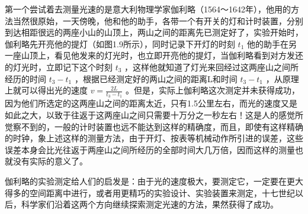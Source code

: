 第一个尝试着去测量光速的是意大利物理学家伽利略（1564～1642年），他用的方法当然很原始，一天傍晚，他和他的助手，各带一个有开关的灯和计时装置，分别到达相距很远的两座小山的山顶上，两山之间的距离先已测定好了，实验开始时，伽利略先开亮他的提灯（如图1.9所示），同时记录下开灯的时刻
\(t_{1}\)
他的助手在另一座山顶上，看见他发来的灯光时，也立即开亮他的提灯，当伽利略看到对方发还的灯光时，立即记下这个时刻
\(t_{3}\) ，这样他就知道了灯光来回经过这两座山之间所经历的时间
\(t_{3}-t_{1}\) ，根据已经测定好的两山之间的距离L和时间 \(t_{3}-t_{1}\)
，从原理上就可以得出光的速度 \(v=\frac{2L}{t_{3}-t_{1}}\)
。但是，实际上伽利略这次测定并未获得成功，因为他们所选定的这两座山之间的距离太近，只有1.5公里左右，而光的速度又是如此之大，以致于往返于这两座山之间只需要十万分之一秒左右！这是人的感觉所觉察不到的，一般的计时装置也远不能达到这样的精确度，而且，即使有这样精确的时钟，象上述这样的测量方法，由于开灯、按表等机械动作所引进的误差，这些误差本身会比光往返于两座山之间所经历的全部时间大几万倍，因而这样的测量也就没有实际的意义了。

伽利略的实验测定给人们的启发是：由于光的速度极大，要测定它，一定要在更大得多的空间距离中进行，或者用更精巧的实验设计、实验装置来测定，十七世纪以后，科学家们沿着这两个方向继续探索测定光速的方法，果然获得了成功。

